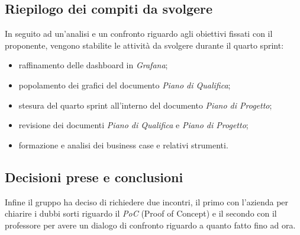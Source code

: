 \documentclass[italian,12pt]{article}
\begin{document}
\subsection{Riepilogo dei compiti da svolgere}
In seguito ad un'analisi e un confronto riguardo agli obiettivi fissati con il proponente,
vengono stabilite le attività da svolgere durante il quarto sprint:
\begin{itemize}
	\item raffinamento delle dashboard in \textit{Grafana};
	\item popolamento dei grafici del documento \textit{Piano di Qualifica};
	\item stesura del quarto sprint all'interno del documento \textit{Piano di Progetto};
	\item revisione dei documenti \textit{Piano di Qualifica} e \textit{Piano di Progetto};
	\item formazione e analisi dei business case e relativi strumenti.
\end{itemize}

\subsection{Decisioni prese e conclusioni}
Infine il gruppo ha deciso di richiedere due incontri, il primo con l'azienda per chiarire i dubbi sorti riguardo
il \textit{PoC} (Proof of Concept) e il secondo con il professore per avere un dialogo di confronto riguardo a quanto
fatto fino ad ora.
\end{document}
